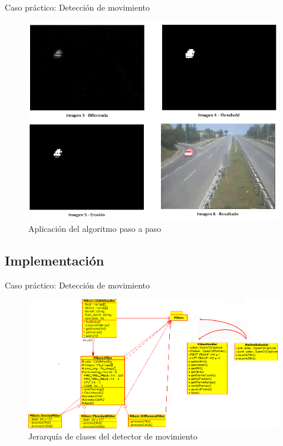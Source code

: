 \documentclass{beamer}
\begin{document}
\begin{frame}{Caso práctico: Detección de movimiento}
  \begin{figure}
    \begin{center}
      \includegraphics[width=.6\textwidth]{filters_step_by_step.png}
      \caption{Aplicación del algoritmo paso a paso}
    \end{center}
  \end{figure}
\end{frame}

\subsection{Implementación}

\begin{frame}{Caso práctico: Detección de movimiento}
  \begin{figure}
    \begin{center}
      \includegraphics[width=.8\textwidth]{UML.png}
      \caption{Jerarquía de clases del detector de movimiento}
    \end{center}
  \end{figure}
\end{frame}
\end{document}
